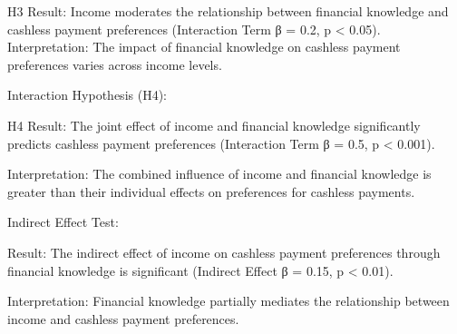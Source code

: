 \documentclass[
  super,
  preprint,
  3p]{elsarticle}
\begin{document}
H3 Result: Income moderates the relationship between financial knowledge
and cashless payment preferences (Interaction Term β = 0.2, p
\textless{} 0.05). Interpretation: The impact of financial knowledge on
cashless payment preferences varies across income levels.

Interaction Hypothesis (H4):

H4 Result: The joint effect of income and financial knowledge
significantly predicts cashless payment preferences (Interaction Term β
= 0.5, p \textless{} 0.001).

Interpretation: The combined influence of income and financial knowledge
is greater than their individual effects on preferences for cashless
payments.

Indirect Effect Test:

Result: The indirect effect of income on cashless payment preferences
through financial knowledge is significant (Indirect Effect β = 0.15, p
\textless{} 0.01).

Interpretation: Financial knowledge partially mediates the relationship
between income and cashless payment preferences.
\end{document}
